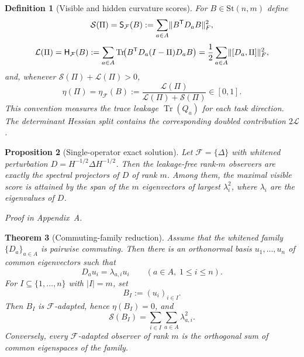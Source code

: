 \documentclass[11pt,a4paper]{article}
\numberwithin{equation}{section}
\DeclareMathOperator{\Tr}{Tr}
\DeclarePairedDelimiter{\norm}{\lVert}{\rVert}
\newcommand{\St}{\mathrm{St}}
\theoremstyle{thmcompact}
\newtheorem{theorem}{Theorem}[section]
\newtheorem{proposition}[theorem]{Proposition}
\newtheorem{definition}[theorem]{Definition}
\theoremstyle{remark}
\newcommand{\proofappendix}{\par{\hfill\scriptsize\emph{Proof in Appendix~A.}}\par}
\begin{document}
\begin{definition}[Visible and hidden curvature scores]
\label{def:scores}
For $B\in\St(n,m)$ define
\begin{equation}
\mathcal S(\Pi)=\mathsf S_{\mathcal F}(B):=\sum_{a\in A}\norm{B^{\mathsf T}D_aB}_F^2,
\label{eq:S-def}
\end{equation}
\begin{equation}
\mathcal L(\Pi)=\mathsf H_{\mathcal F}(B):=\sum_{a\in A}\Tr\!\bigl(B^{\mathsf T}D_a(I-\Pi)D_aB\bigr)=\frac12\sum_{a\in A}\norm{[D_a,\Pi]}_F^2,
\label{eq:H-def}
\end{equation}
and, whenever $\mathcal S(\Pi)+\mathcal L(\Pi)>0$,
\begin{equation}
\eta(\Pi)=\eta_{\mathcal F}(B):=\frac{\mathcal L(\Pi)}{\mathcal L(\Pi)+\mathcal S(\Pi)}\in[0,1].
\label{eq:eta-def}
\end{equation}
This convention measures the trace leakage $\Tr(Q_a)$ for each task direction.
The determinant Hessian split contains the corresponding doubled contribution
$2\mathcal L$.
\end{definition}

\begin{proposition}[Single-operator exact solution]
\label{prop:single-operator-solution}
Let $\mathcal F=\{\Delta\}$ with whitened perturbation $D=H^{-1/2}\Delta H^{-1/2}$. Then the leakage-free rank-$m$ observers are exactly the spectral projectors of $D$ of rank $m$. Among them, the maximal visible score is attained by the span of the $m$ eigenvectors of largest $\lambda_i^2$, where $\lambda_i$ are the eigenvalues of $D$.
\end{proposition}

\proofappendix

\begin{theorem}[Commuting-family reduction]
\label{thm:commuting-family}
Assume that the whitened family $\{D_a\}_{a\in A}$ is pairwise commuting. Then there is an orthonormal basis $u_1,\dots,u_n$ of common eigenvectors such that
\begin{equation}
D_a u_i=\lambda_{a,i}u_i
\qquad (a\in A,\; 1\le i\le n).
\label{eq:common-eigenbasis}
\end{equation}
For $I\subseteq\{1,\dots,n\}$ with $|I|=m$, set
\begin{equation}
B_I:=(u_i)_{i\in I}.
\label{eq:BI-def}
\end{equation}
Then $B_I$ is $\mathcal F$-adapted, hence $\eta(B_I)=0$, and
\begin{equation}
\mathcal S(B_I)=\sum_{i\in I}\sum_{a\in A}\lambda_{a,i}^2.
\label{eq:score-common-basis}
\end{equation}
Conversely, every $\mathcal F$-adapted observer of rank $m$ is the orthogonal sum of common eigenspaces of the family.
\end{theorem}
\end{document}
